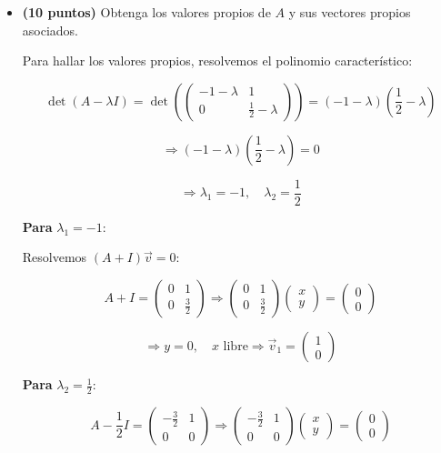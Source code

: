 \documentclass[a4paper]{article}
\begin{document}
\begin{itemize}

\item[(a)] \textbf{(10 puntos)} Obtenga los valores propios de \(A\) y sus vectores propios asociados.

Para hallar los valores propios, resolvemos el polinomio característico:

\[
\det(A - \lambda I) = \det\left( \begin{pmatrix} -1 - \lambda & 1 \\ 0 & \frac{1}{2} - \lambda \end{pmatrix} \right)
= (-1 - \lambda)\left( \frac{1}{2} - \lambda \right)
\]

\[
\Rightarrow (-1 - \lambda)\left( \frac{1}{2} - \lambda \right) = 0
\]

\[
\Rightarrow \lambda_1 = -1, \quad \lambda_2 = \frac{1}{2}
\]

\vspace{0.3cm}

\textbf{Para } \( \lambda_1 = -1 \):

Resolvemos \( (A + I)\vec{v} = 0 \):

\[
A + I = \begin{pmatrix} 0 & 1 \\ 0 & \frac{3}{2} \end{pmatrix}
\Rightarrow \begin{pmatrix} 0 & 1 \\ 0 & \frac{3}{2} \end{pmatrix} \begin{pmatrix} x \\ y \end{pmatrix} = \begin{pmatrix} 0 \\ 0 \end{pmatrix}
\]

\[
\Rightarrow y = 0,\quad x\text{ libre}
\Rightarrow \vec{v}_1 = \begin{pmatrix} 1 \\ 0 \end{pmatrix}
\]

\vspace{0.3cm}

\textbf{Para } \( \lambda_2 = \frac{1}{2} \):

\[
A - \frac{1}{2}I = \begin{pmatrix} -\frac{3}{2} & 1 \\ 0 & 0 \end{pmatrix}
\Rightarrow \begin{pmatrix} -\frac{3}{2} & 1 \\ 0 & 0 \end{pmatrix} \begin{pmatrix} x \\ y \end{pmatrix} = \begin{pmatrix} 0 \\ 0 \end{pmatrix}
\]


\end{itemize}
\end{document}
